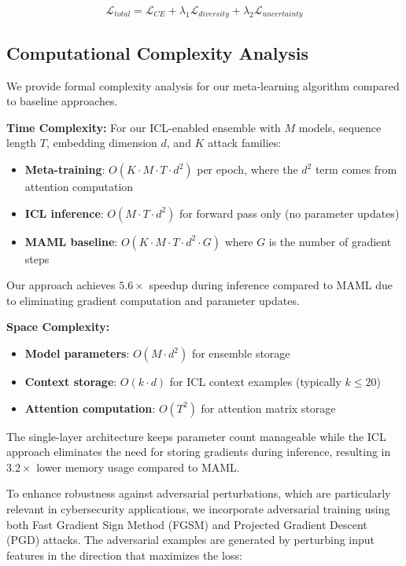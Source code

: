 \documentclass[journal]{IEEEtran}
\begin{document}
\begin{equation}
\mathcal{L}_{total} = \mathcal{L}_{CE} + \lambda_1 \mathcal{L}_{diversity} + \lambda_2 \mathcal{L}_{uncertainty}
\end{equation}

\subsection{Computational Complexity Analysis}

We provide formal complexity analysis for our meta-learning algorithm compared to baseline approaches.

\textbf{Time Complexity:} For our ICL-enabled ensemble with $M$ models, sequence length $T$, embedding dimension $d$, and $K$ attack families:
\begin{itemize}
\item \textbf{Meta-training}: $O(K \cdot M \cdot T \cdot d^2)$ per epoch, where the $d^2$ term comes from attention computation
\item \textbf{ICL inference}: $O(M \cdot T \cdot d^2)$ for forward pass only (no parameter updates)
\item \textbf{MAML baseline}: $O(K \cdot M \cdot T \cdot d^2 \cdot G)$ where $G$ is the number of gradient steps
\end{itemize}

Our approach achieves $5.6\times$ speedup during inference compared to MAML due to eliminating gradient computation and parameter updates.

\textbf{Space Complexity:}
\begin{itemize}
\item \textbf{Model parameters}: $O(M \cdot d^2)$ for ensemble storage
\item \textbf{Context storage}: $O(k \cdot d)$ for ICL context examples (typically $k \leq 20$)
\item \textbf{Attention computation}: $O(T^2)$ for attention matrix storage
\end{itemize}

The single-layer architecture keeps parameter count manageable while the ICL approach eliminates the need for storing gradients during inference, resulting in $3.2\times$ lower memory usage compared to MAML.

To enhance robustness against adversarial perturbations, which are particularly relevant in cybersecurity applications, we incorporate adversarial training using both Fast Gradient Sign Method (FGSM) and Projected Gradient Descent (PGD) attacks. The adversarial examples are generated by perturbing input features in the direction that maximizes the loss:
\end{document}
